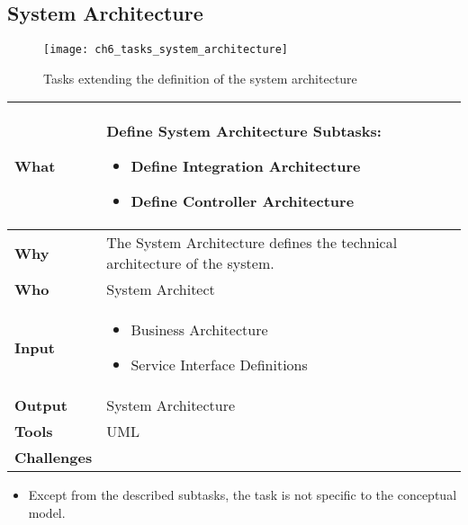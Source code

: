 \subsection{System Architecture }

\begin{figure}[htpb] \centering 
	\texttt{[image: ch6\_tasks\_system\_architecture]} 
	\caption{Tasks extending the definition of the system architecture} 
	\label{fig:ch6_tasks_system_architecture} 
\end{figure}


\begin{minipage}{\textwidth}
 \label{table:ch6_Task_Define_System_Architecture}
\begin{tabular}
	{|m{3cm}|m{10cm}|} \hline \bfseries What & Define System Architecture
	Subtasks:
	\begin{itemize}
		\item Define Integration Architecture
		\item Define Controller Architecture
	\end{itemize}
	\\
	\hline \bfseries Why & The System Architecture defines the technical architecture of the system.\\
	\hline \bfseries Who & System Architect\\
	\hline \bfseries Input & 
		\begin{itemize}
			\item Business Architecture
			\item Service Interface Definitions
		\end{itemize}
	\\
	\hline \bfseries Output & System Architecture\\
	\hline \bfseries Tools & \ac{UML}\\
	\hline \bfseries Challenges & \\
	\hline 
\end{tabular}
\end{minipage}

\begin{itemize}
	\item Except from the described subtasks, the task is not specific to the conceptual model.
\end{itemize}

